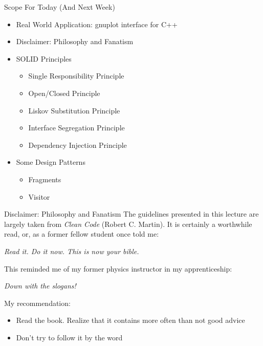 \begin{frame}{Scope For Today (And Next Week)}
%
\begin{itemize}
\item Real World Application: gnuplot interface for C++
\item Disclaimer: Philosophy and Fanatism
\item SOLID Principles
	\begin{itemize}
	\item Single Responsibility Principle
	\item Open/Closed Principle
	\color{gray}
	\item Liskov Substitution Principle
	\item Interface Segregation Principle
	\item Dependency Injection Principle
	\end{itemize}
\item Some Design Patterns
	\begin{itemize}
	\item Fragments
	\item Visitor
	\end{itemize}
\end{itemize}
%
\end{frame}


\begin{frame}{Disclaimer: Philosophy and Fanatism}
%
\small
The guidelines presented in this lecture are largely taken from \emph{Clean Code} (Robert C. Martin).
It is certainly a worthwhile read, or, as a former fellow student once told me:

\begin{defbox}
\emph{Read it. Do it now. This is now your bible.}
\end{defbox}
\pause

This reminded me of my former physics instructor in my apprenticeship:
\begin{defbox}
\emph{Down with the slogans!}
\end{defbox}
\pause

My recommendation:
\begin{itemize}
\item Read the book. Realize that it contains more often than not good advice
\item Don't try to follow it by the word
\end{itemize}
%
\end{frame}

